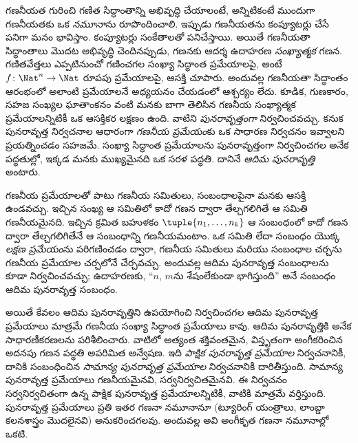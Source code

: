 \documentclass[../../../include/open-logic-section]{subfiles}
\begin{document}

గణనీయత గురించి గణిత సిద్ధాంతాన్ని అభివృద్ధి చేయాలంటే, అన్నిటికంటే
ముందుగా గణనీయతకు ఒక \emph{నమూనా}ను రూపొందించాలి. ఇప్పుడు గణనీయతను
కంప్యూటర్లు చేసే పనిగా మనం భావిస్తాం. కంప్యూటర్లు సంకేతాలతో
పనిచేస్తాయి. అయితే గణనీయతా సిద్ధాంతాలు మొదట అభివృద్ధి చెందినప్పుడు,
గణనకు ఆదర్శ ఉదాహరణ \emph{సంఖ్యాత్మక} గణన. గణితవేత్తలు ఎప్పటినుంచో
గణించగల సంఖ్యా సిద్ధాంత ప్రమేయాలపై, అంటే $f\colon \Nat^n \to
\Nat$ రూపపు ప్రమేయాలపై, ఆసక్తి చూపారు. అందువల్ల గణనీయతా సిద్ధాంతం
ఆరంభంలో అలాంటి ప్రమేయాలనే అధ్యయనం చేయడంలో ఆశ్చర్యం లేదు. కూడిక,
గుణకారం, సహజ సంఖ్యల ఘాతాంకనం వంటి మనకు బాగా తెలిసిన గణనీయ సంఖ్యాత్మక
ప్రమేయాలన్నిటికీ ఒక ఆసక్తికర లక్షణం ఉంది. వాటిని \emph{పునరావృత్తంగా}
నిర్వచించవచ్చు. కనుక పునరావృత్త నిర్వచనాల ఆధారంగా \emph{గణనీయ
ప్రమేయం}కు ఒక సాధారణ నిర్వచనం ఇవ్వాలని ప్రయత్నించడం సహజమే.
సంఖ్యా సిద్ధాంత ప్రమేయాలను పునరావృత్తంగా నిర్వచించగల అనేక పద్ధతుల్లో,
ఇక్కడ మనకు ముఖ్యమైనది ఒక సరళ పద్ధతి. దానినే
\emph{ఆదిమ పునరావృత్తి} అంటారు.

గణనీయ ప్రమేయాలతో పాటు గణనీయ సమితులు, సంబంధాలపైనా మనకు ఆసక్తి
ఉండవచ్చు. ఇచ్చిన సంఖ్య ఆ సమితిలో  కాదో
గణన ద్వారా తేల్చగలిగితే ఆ సమితి గణనీయమైనది. ఇచ్చిన క్రమిత బహుళకం
$\tuple{n_1, \dots, n_k}$ ఆ సంబంధంలో  కాదో
గణన ద్వారా తేల్చగలిగితేనే ఆ సంబంధాన్ని గణనీయమంటాం. ఒక సమితి లేదా సంబంధం
యొక్క \emph{లక్షణ ప్రమేయం}ను పరిగణించడం ద్వారా, గణనీయ సమితులు మరియు
సంబంధాల చర్చను గణనీయ ప్రమేయాల చర్చలోనే చేర్చవచ్చు. అందువల్ల ఆదిమ
పునరావృత్త సంబంధాలను కూడా నిర్వచించవచ్చు; ఉదాహరణకు, ``$n$, $m$ను
శేషంలేకుండా భాగిస్తుంది'' అనే సంబంధం ఆదిమ పునరావృత్త సంబంధం.

అయితే కేవలం ఆదిమ పునరావృత్తిని ఉపయోగించి నిర్వచించగల ఆదిమ
పునరావృత్త ప్రమేయాలు మాత్రమే గణనీయ సంఖ్యా సిద్ధాంత ప్రమేయాలు కావు.
ఆదిమ పునరావృత్తికి అనేక సాధారణీకరణలను పరిశీలించారు. వాటిలో అత్యంత
శక్తివంతమైన, విస్తృతంగా అంగీకరించిన అదనపు గణన పద్ధతి అపరిమిత
అన్వేషణ. ఇది \emph{పాక్షిక పునరావృత్త ప్రమేయాల} నిర్వచనానికీ,
దానికి సంబంధించిన \emph{సామాన్య పునరావృత్త ప్రమేయాల} నిర్వచనానికీ
దారితీస్తుంది. సామాన్య పునరావృత్త ప్రమేయాలు గణనీయమైనవి,
సర్వనిర్వచితమైనవి. ఈ నిర్వచనం సర్వనిర్వచితంగా ఉన్న పాక్షిక పునరావృత్త
ప్రమేయాలన్నిటికీ, వాటికి మాత్రమే వర్తిస్తుంది. పునరావృత్త ప్రమేయాలు
ప్రతి ఇతర గణనా నమూనానూ (ట్యూరింగ్ యంత్రాలు, లాంబ్డా కలనశాస్త్రం
మొదలైనవి) అనుకరించగలవు. అందువల్ల అవి అంగీకృత గణనా నమూనాల్లో ఒకటి.
\end{document}
